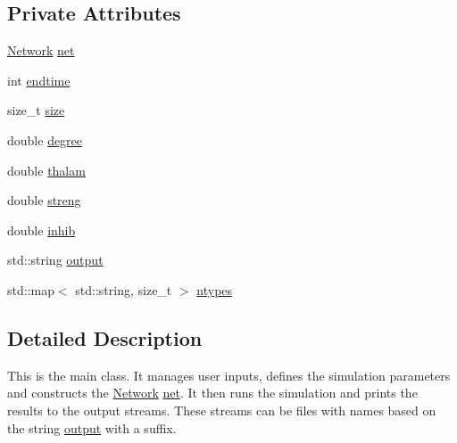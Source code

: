 \subsection*{Private Attributes}
\begin{DoxyCompactItemize}
\item 
\hyperlink{classNetwork}{Network} \hyperlink{classSimulation_a980a224fe68945549f217067ffc74f7c}{net}
\item 
int \hyperlink{classSimulation_ae57735a4ad942d9d217fb2235a644d1b}{endtime}
\item 
size\+\_\+t \hyperlink{classSimulation_ae198f9ac020ed6bc6ebbd608ab3f959d}{size}
\item 
double \hyperlink{classSimulation_ad0197878662d63d3ad1699aa7ffe01b2}{degree}
\item 
double \hyperlink{classSimulation_a7fca2f5f79a662f91736b0e5f30598c1}{thalam}
\item 
double \hyperlink{classSimulation_adfda098679d8fcb864ecd87409087d02}{streng}
\item 
double \hyperlink{classSimulation_a14c04fb020df35f875b1f5b2aab7a562}{inhib}
\item 
std\+::string \hyperlink{classSimulation_a9ad4c807c6ddf9066041f764f0ccb9dc}{output}
\item 
std\+::map$<$ std\+::string, size\+\_\+t $>$ \hyperlink{classSimulation_a445d67187d6cc08c4c098ca498ee87d7}{ntypes}
\end{DoxyCompactItemize}


\subsection{Detailed Description}
This is the main class. It manages user inputs, defines the simulation parameters and constructs the \hyperlink{classNetwork}{Network} \hyperlink{classSimulation_a980a224fe68945549f217067ffc74f7c}{net}. It then runs the simulation and prints the results to the output streams. These streams can be files with names based on the string \hyperlink{classSimulation_a9ad4c807c6ddf9066041f764f0ccb9dc}{output} with a suffix.

